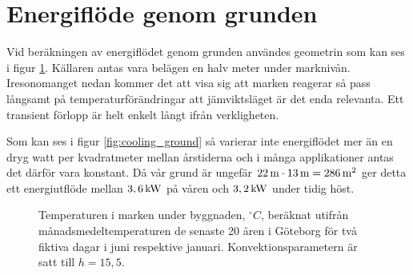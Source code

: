 \section{Energiflöde genom grunden}

% 
% 


Vid beräkningen av energiflödet genom grunden användes geometrin som kan ses i figur \ref{fig:groundheat}. Källaren antas vara belägen en halv meter under marknivån. Iresonomanget nedan kommer det att visa sig att marken reagerar så pass långsamt på temperaturförändringar att jämviktsläget är det enda relevanta. Ett transient förlopp är helt enkelt långt ifrån verkligheten.

Som kan ses i figur \ref{fig:cooling_ground} så varierar inte energiflödet mer än en dryg watt per kvadratmeter mellan årstiderna och i många applikationer antas det därför vara konstant. Då vår grund är ungefär $\unit[22]{m}\cdot\unit[13]{m}=\unit[286]{m^2}$ ger detta ett energiutflöde mellan $\unit[3,6]{kW}$ på våren och $\unit[3,2]{kW}$ under tidig höst. 

\begin{figure}
\centering
{}
\caption{\label{fig:groundheat}
Temperaturen i marken under byggnaden, $\unit{^\circ C}$, beräknat utifrån månadsmedeltemperaturen de senaste 20 åren i Göteborg för två fiktiva dagar i juni respektive januari. Konvektionsparametern är satt till $h=15,5$. }
\end{figure}


